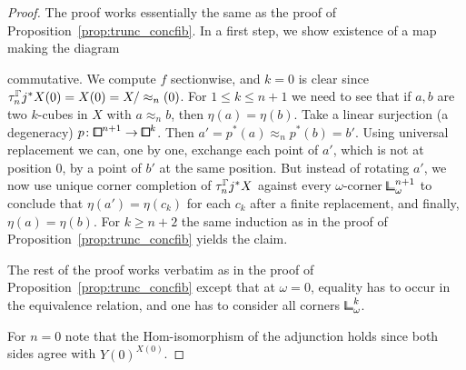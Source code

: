\begin{proof}
The proof works essentially the same as the proof of Proposition~\ref{prop:trunc_concfib}.
In a first step, we show existence of a map making the diagram
\begin{center}
\end{center}
commutative.
We compute $f$ sectionwise, and $k = 0$ is clear since $\tau^{\bbGamma}_n j^\ast X(0) = X(0) = X/\approx_n(0)$.
For $1\leq k\leq n+1$ we need to see that if $a,b$ are two $k$-cubes in $X$ with $a\approx_n b$, then $\eta(a) = \eta(b)$.
Take a linear surjection (a degeneracy) $p\colon{\bbox}^{n+1}\to{\bbox}^k$.
Then $a' = p^\ast(a) \approx_n p^\ast(b) = b'$.
Using universal replacement we can, one by one, exchange each point of $a'$, which is not at position $0$, by a point of $b'$ at the same position.
But instead of rotating $a'$, we now use unique corner completion of $\tau_n^{\bbGamma} j^\ast X$ against every $\omega$-corner ${\bbcor}^{n+1}_\omega$
to conclude that $\eta(a') = \eta(c_k)$ for each $c_k$ after a finite replacement, and finally, $\eta(a) = \eta(b)$.
For $k\geq n+2$ the same induction as in the proof of Proposition~\ref{prop:trunc_concfib} yields the claim.

The rest of the proof works verbatim as in the proof of Proposition~\ref{prop:trunc_concfib}
except that at $\omega = 0$, equality has to occur in the equivalence relation, and one has to consider all corners ${\bbcor}^k_\omega$.

For $n=0$ note that the Hom-isomorphism of the adjunction holds since both sides agree with $Y(0)^{X(0)}$.
\end{proof}


